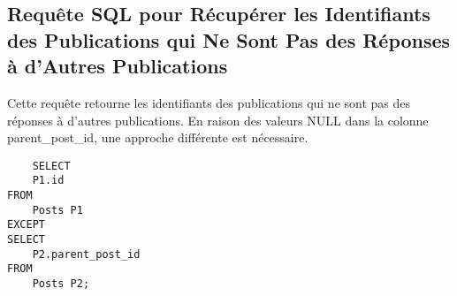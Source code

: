 \subsection{Requête SQL pour Récupérer les Identifiants des Publications qui Ne Sont Pas des Réponses à d'Autres Publications}

Cette requête retourne les identifiants des publications qui ne sont pas des réponses à d'autres publications. En raison des valeurs NULL dans la colonne parent\_post\_id, une approche différente est nécessaire.

\begin{lstlisting}
    SELECT
    P1.id
FROM
    Posts P1
EXCEPT
SELECT
    P2.parent_post_id
FROM
    Posts P2;
\end{lstlisting}